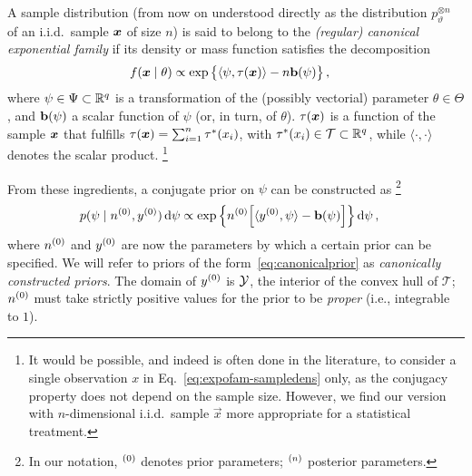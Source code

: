 A sample distribution
(from now on understood directly as the distribution $p_\vartheta^{\otimes n}$ of an i.i.d.\ sample ${\bm x}$ of size $n$)
is said to belong to the \emph{(regular) canonical exponential family} if its density or mass function satisfies the decomposition
\begin{align}
\label{eq:expofam-sampledens}
f({\bm x} \mid \theta) &\propto \exp\big\{\langle \psi, \tau({\bm x}) \rangle - n \mathbf{b}(\psi)\big\}\,,
\end{align}
where $\psi \in \Psi \subset \mathbb{R}^q$ is a transformation of the (possibly vectorial) parameter $\theta \in \Theta$,
and $\mathbf{b}(\psi)$ a scalar function of $\psi$ (or, in turn, of $\theta$).
$\tau({\bm x})$ is a function of the sample ${\bm x}$ that fulfills $\tau({\bm x}) = \sum_{i=1}^n \tau^*(x_i)$,
with $\tau^*(x_i) \in \mathcal{T} \subset \mathbb{R}^q$,
while $\langle\cdot, \cdot\rangle$ denotes the scalar product.%
\footnote{\label{foot:dataisplural}It would be possible, and indeed is often done in the literature,
to consider a single observation $x$ in Eq.~\eqref{eq:expofam-sampledens} only,
as the conjugacy property does not depend on the sample size.
However, we find our version with $n$-dimensional i.i.d.\ sample $\vec{x}$
more appropriate for a statistical treatment.} %

From these ingredients, a conjugate prior on $\psi$ can be constructed as%
\footnote{In our notation, ${}^{(0)}$ denotes prior parameters; ${}^{(n)}$ posterior parameters.}
\begin{align}
\label{eq:canonicalprior}
p(\psi \mid n^{(0)}, y^{(0)}) \,\mathrm{d}\psi
 &\propto \exp\Big\{ n^{(0)} \Big[ \langle y^{(0)}, \psi \rangle - \mathbf{b}(\psi) \Big] \Big\} \,\mathrm{d}\psi\,,
\end{align}
where $n^{(0)}$ and $y^{(0)}$ are now the parameters by which a certain prior can be specified.
We will refer to priors of the form~\eqref{eq:canonicalprior} as \emph{canonically constructed priors}.
The domain of $y^{(0)}$ is $\mathcal{Y}$, the interior of the convex hull of $\mathcal{T}$;
$n^{(0)}$ must take strictly positive values for the prior to be \emph{proper} (i.e., integrable to $1$).

